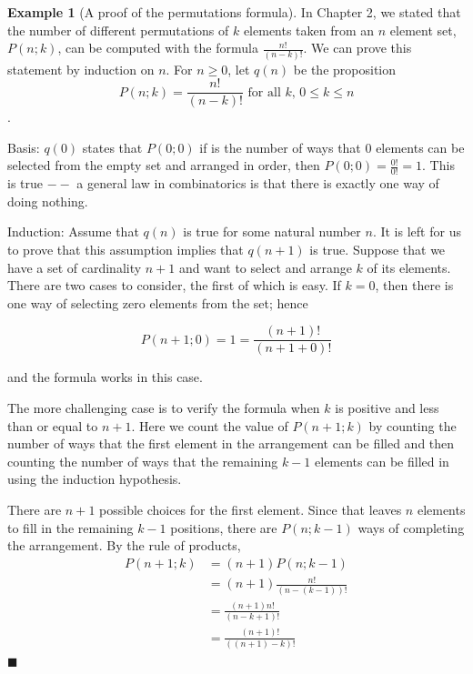\documentclass[10pt,]{book}
\theoremstyle{plain}
\theoremstyle{definition}
\theoremstyle{definition}
\theoremstyle{definition}
\newtheorem{example}[theorem]{Example}
\theoremstyle{definition}
\begin{document}
\begin{example}[A proof of the permutations formula]\label{ex-permuations-formula-proof}
In Chapter 2, we stated that the number of different permutations of \(k\) elements taken from an \(n\) element set, \(P(n; k)\), can be computed with the formula \(\frac{n!}{(n-k)!}\). We can prove this statement by induction on \(n\). For \(n \geq  0\), let \(q(n)\) be the proposition
\begin{equation*}P(n; k) = \frac{n!}{(n-k)!} \textrm{  for all } k \textrm{, } 0 \le k \le n\end{equation*}.%
\par
Basis: \(q(0)\) states that  \(P(0; 0) \) if is the number of ways that \(0\) elements can be selected from the empty set and arranged in order, then \(P(0; 0) = \frac{0!}{0!} = 1 \).  This is true \(--\) a general law in combinatorics is that there is exactly one way of doing nothing.%
\par
Induction: Assume that \(q(n)\) is true for some natural number \(n\). It is left for us to prove that this assumption implies that \(q(n +1)\) is true. Suppose that we have a set of cardinality \(n + 1\) and want to select and arrange \(k\) of its elements. There are two cases to consider, the first of which is easy. If \(k = 0\), then there is one way of selecting zero elements from the set; hence

\begin{equation*}P(n + 1; 0) = 1 =\frac{(n+1)!}{(n+1+0)!}\end{equation*}

and the formula works in this case.%
\par
The more challenging case is to verify the formula when \(k\) is positive and less than or equal to \(n+1\). Here we count the value of \(P(n+ 1; k)\) by counting the number of ways that the first element in the arrangement can be filled and then counting the number of ways that the remaining \(k -1\) elements can be filled in using the induction hypothesis.%
\par
There are \(n + 1\) possible choices for the first element. Since that leaves \(n\) elements to fill in the remaining \(k - 1\) positions, there are \(P(n; k - 1)\) ways of completing the arrangement. By the rule of products,
\begin{equation*}
\begin{split}
P(n +1;k) &= (n+1) P(n;k-1) \\
& = (n+1) \frac{n!}{(n-(k-1))!} \\
& = \frac{(n+1) n!}{(n-k+1)!}\\
& = \frac{(n+1)!}{((n+1)-k)!}
\end{split}
\end{equation*}\(\blacksquare\)
%
\end{example}
\end{document}
